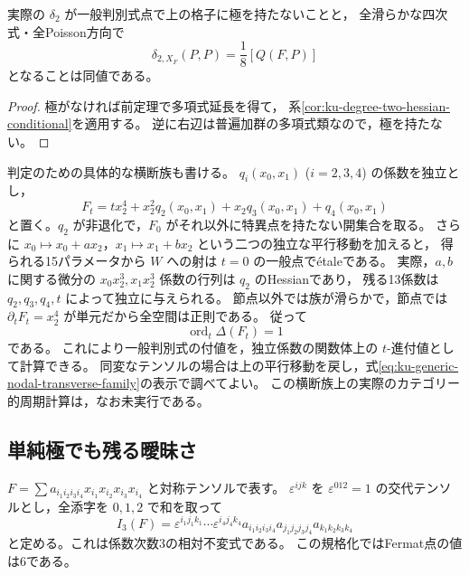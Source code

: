 \begin{corollary}[一般Hessian公式と節点での極の消滅]
\label{cor:ku-degree-two-nodal-hessian-criterion}
実際の $\delta_2$ が一般判別式点で上の格子に極を持たないことと，
全滑らかな四次式・全Poisson方向で
\[
 \delta_{2,X_F}(P,P)=\frac18[Q(F,P)]
\]
となることは同値である。
\end{corollary}
\begin{proof}
極がなければ前定理で多項式延長を得て，
系\ref{cor:ku-degree-two-hessian-conditional}を適用する。
逆に右辺は普遍加群の多項式類なので，極を持たない。
\end{proof}

判定のための具体的な横断族も書ける。
$q_i(x_0,x_1)$ ($i=2,3,4$) の係数を独立とし，
\begin{equation}\label{eq:ku-generic-nodal-transverse-family}
 F_t=t x_2^4+x_2^2q_2(x_0,x_1)+x_2q_3(x_0,x_1)+q_4(x_0,x_1)
\end{equation}
と置く。$q_2$ が非退化で，$F_0$ がそれ以外に特異点を持たない開集合を取る。
さらに $x_0\mapsto x_0+a x_2$，$x_1\mapsto x_1+b x_2$ という二つの独立な平行移動を加えると，
得られる15パラメータから $W$ への射は $t=0$ の一般点で\'etaleである。
実際，$a,b$ に関する微分の $x_0x_2^3,x_1x_2^3$ 係数の行列は $q_2$ のHessianであり，
残る13係数は $q_2,q_3,q_4,t$ によって独立に与えられる。
節点以外では族が滑らかで，節点では $\partial_tF_t=x_2^4$ が単元だから全空間は正則である。
従って
\[
 \operatorname{ord}_t\Delta(F_t)=1
\]
である\cite[Theorem 1.1]{PoonenStoll2025}。
これにより一般判別式の付値を，独立係数の関数体上の $t$-進付値として計算できる。
同変なテンソルの場合は上の平行移動を戻し，式\eqref{eq:ku-generic-nodal-transverse-family}の表示で調べてよい。
この横断族上の実際のカテゴリー的周期計算は，なお未実行である。

\subsection{単純極でも残る曖昧さ}

$F=\sum a_{i_1i_2i_3i_4}x_{i_1}x_{i_2}x_{i_3}x_{i_4}$ と対称テンソルで表す。
$\varepsilon^{ijk}$ を $\varepsilon^{012}=1$ の交代テンソルとし，全添字を $0,1,2$ で和を取って
\begin{equation}\label{eq:ku-cubic-contraction-invariant}
 I_3(F)=
 \varepsilon^{i_1j_1k_1}\cdots\varepsilon^{i_4j_4k_4}
 a_{i_1i_2i_3i_4}a_{j_1j_2j_3j_4}a_{k_1k_2k_3k_4}
\end{equation}
と定める。これは係数次数3の相対不変式である。
この規格化ではFermat点の値は6である。

